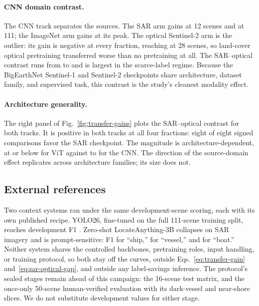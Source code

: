 \paragraph{CNN domain contrast.}
The CNN track separates the sources. The SAR arm gains
\GainCnnSarTenAbs{} at 12 scenes and \GainCnnSarHundredAbs{} at 111; the
ImageNet arm gains \GainCnnImageNetTwentyFiveAbs{} at its peak. The optical
Sentinel-2 arm is the outlier: its gain is negative at every fraction,
reaching \GainCnnOpticalTwentyFive{} at 28 scenes, so land-cover optical
pretraining transferred worse than no pretraining at all. The SAR--optical
contrast runs from \SarOptCnnHundredAbs{} to \SarOptCnnTwentyFiveAbs{} and is
largest in the scarce-label regime. Because the BigEarthNet Sentinel-1 and
Sentinel-2 checkpoints share architecture, dataset family, and supervised
task, this contrast is the study's cleanest modality effect.

\paragraph{Architecture generality.}
The right panel of Fig.~\ref{fig:transfer-gains} plots the SAR--optical
contrast for both tracks. It is positive in both tracks at all four fractions:
eight of eight signed comparisons favor the SAR checkpoint. The magnitude is
architecture-dependent, at or below \SarOptVitMaxAbs{} for ViT against
\SarOptCnnHundredAbs{} to \SarOptCnnTwentyFiveAbs{} for the CNN. The direction of
the source-domain effect replicates across architecture families; its size
does not.

\subsection{External references}
\label{sec:final-results}

Two context systems ran under the same development-scene scoring, each with
its own published recipe. YOLO26, fine-tuned on the full 111-scene training
split, reaches development F1 \RefYoloDevF. Zero-shot LocateAnything-3B
collapses on SAR imagery and is prompt-sensitive: F1 \RefLocShip{} for
``ship,'' \RefLocVessel{} for ``vessel,'' and \RefLocBoat{} for ``boat.''
Neither system shares the controlled backbones, pretraining roles, input
handling, or training protocol, so both stay off the curves, outside
Eqs.~\eqref{eq:transfer-gain} and~\eqref{eq:sar-optical-gap}, and outside any
label-savings inference. The protocol's sealed stages remain ahead of this
campaign: the 16-scene test matrix, and the once-only 50-scene
human-verified evaluation with its dark-vessel and near-shore slices. We do
not substitute development values for either stage.
